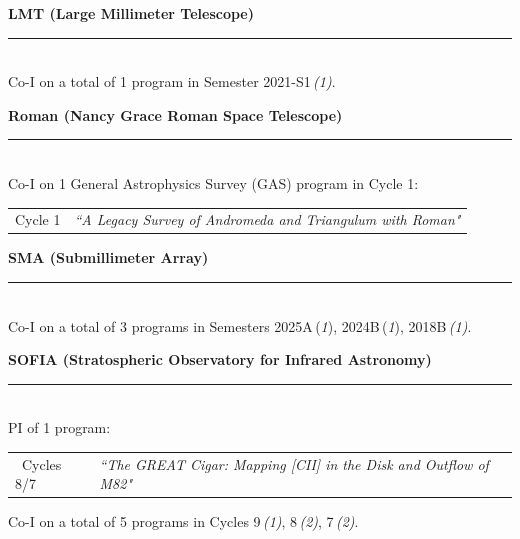 \documentclass[11pt]{article}
\makeatletter
\def\vhrulefill#1{\leavevmode\leaders\hrule \@height #1\hfill \kern\z@}
\newcommand{\subsectionname}[1]{{\large\bf #1 \vhrulefill{0.5pt}}}
\makeatother
\begin{document}
\subsectionname{LMT \textmd{\small (Large Millimeter Telescope)}}\\
Co-I on a total of 1 program in Semester 2021-S1\,{\em(1)}.


\subsectionname{Roman \textmd{\small (Nancy Grace Roman Space Telescope)}}\\
Co-I on 1 General Astrophysics Survey (GAS) program in Cycle 1:
\vspace{-6pt}
\begin{longtable}{p{}p{}}
Cycle 1 &  \textit{``A Legacy Survey of Andromeda and Triangulum with Roman"}
\end{longtable}
\vspace{-12pt}


\subsectionname{SMA \textmd{\small (Submillimeter Array)}}\\
Co-I on a total of 3 programs in Semesters 2025A\,({\em1}), 2024B\,({\em1}), 2018B\,{\em(1)}.


\subsectionname{SOFIA \textmd{\small (Stratospheric Observatory for Infrared Astronomy)}}\\
{PI of 1 program:}
\vspace{-6pt}
\begin{longtable}{p{}p{}}
\ Cycles 8/7 & \textit{``The GREAT Cigar: Mapping [CII] in the Disk and Outflow of M82"}\\
\end{longtable}
\vspace{-15pt}
Co-I on a total of 5 programs in Cycles 9\,{\em(1)}, 8\,{\em(2)}, 7\,{\em(2)}.

\end{document}
